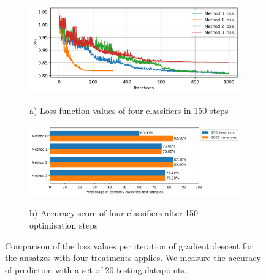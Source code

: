 \begin{figure}
    \begin{subfigure}{\linewidth}
        \includegraphics[width=\linewidth]{Artefact/Appendices/loss_cobyla.png}
        \centerline{a) Loss function values of four classifiers in 150 steps}
    \end{subfigure}
    \begin{subfigure}{\linewidth}
        \includegraphics[width=\linewidth]{Artefact/Appendices/accuracy.png}
        \centerline{b) Accuracy score of four classifiers after 150 optimisation steps}
    \end{subfigure}

    \caption{
        Comparison of the loss values per iteration of gradient descent for the ansatzes with four treatments applies.
        We measure the accuracy of prediction with a set of 20 testing datapoints.
    }
    \label{Fig: Plot Loss and Accuracy}
\end{figure}
